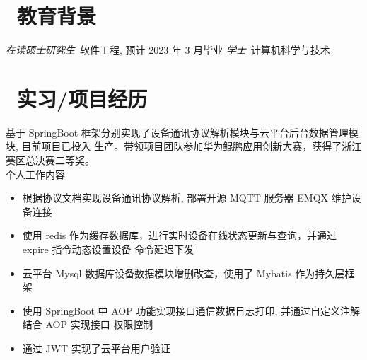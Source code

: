 \documentclass{resume}
\begin{document}


 
\section{\faGraduationCap\  教育背景}
\textit{在读硕士研究生}\ 软件工程, 预计 2023 年 3 月毕业
\textit{学士}\ 计算机科学与技术

\section{\faUsers\ 实习/项目经历}
基于 SpringBoot 框架分别实现了设备通讯协议解析模块与云平台后台数据管理模块, 目前项目已投入 生产。带领项目团队参加华为鲲鹏应用创新大赛，获得了浙江赛区总决赛二等奖。\\ 
个人工作内容
\begin{itemize}
  \item 根据协议文档实现设备通讯协议解析, 部署开源 MQTT 服务器 EMQX 维护设备连接
  \item 使用 redis 作为缓存数据库，进行实时设备在线状态更新与查询，并通过 expire 指令动态设置设备
命令延迟下发
  \item 云平台 Mysql 数据库设备数据模块增删改查，使用了 Mybatis 作为持久层框架
  \item 使用 SpringBoot 中 AOP 功能实现接口通信数据日志打印, 并通过自定义注解结合 AOP 实现接口
权限控制
  \item 通过 JWT 实现了云平台用户验证
\end{itemize}

\end{document}
